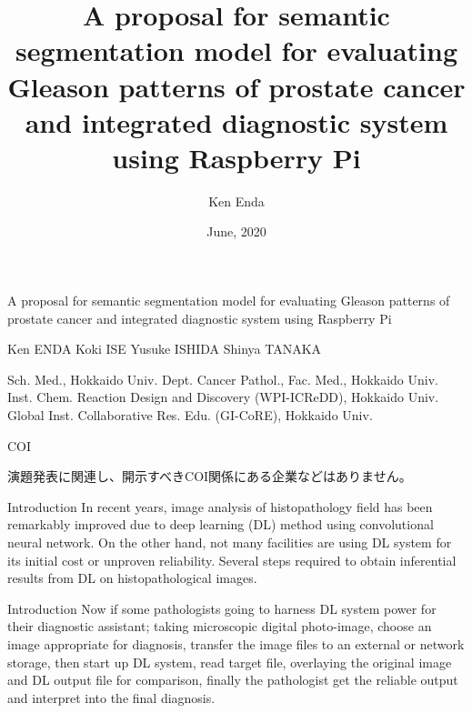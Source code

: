 \documentclass[
  dvipdfmx,
  xcolor={svgnames},
  hyperref={colorlinks,citecolor=DeepPink4,linkcolor=DarkRed,urlcolor=DarkBlue}
  ]{beamer}
\title{}
\title[A proposal of semantic segmentation model for Gleason patterns and integrated diagnostic system using Raspberry Pi]{A proposal for semantic segmentation model for evaluating Gleason patterns of prostate cancer and integrated diagnostic system using Raspberry Pi}
\author{Ken Enda}
\institute{Department of Cancer Pathology Faculty of Medicine, HOKKAIDO UNIVERSITY}
\date[]{June, 2020}
\begin{document}
\nocite{*}

\begin{frame}{}
  \huge A proposal for semantic segmentation model for evaluating Gleason patterns of prostate cancer and integrated diagnostic system using Raspberry Pi\par
  \vspace{0.5zh}
  \small Ken ENDA \cite{student} Koki ISE\cite{student} Yusuke ISHIDA\cite{dept} Shinya TANAKA\cite{dept}\cite{icredd}\cite{gicore}
  \begin{thebibliography}{99}
    \beamertemplatetextbibitems
    \setlength{\itemsep}{-.5zw}
     Sch. Med., Hokkaido Univ.
     Dept. Cancer Pathol., Fac. Med., Hokkaido Univ.
     Inst. Chem. Reaction Design and Discovery (WPI-ICReDD), Hokkaido Univ.  
     Global Inst. Collaborative Res. Edu. (GI-CoRE), Hokkaido Univ.
  \end{thebibliography}
\end{frame}

\begin{frame}{COI}
  \begin{center}
    \setlength{\fboxsep}{1em}
    \par
    \vspace{1zh}
    演題発表に関連し、開示すべきCOI関係にある企業などはありません。
  \end{center}
\end{frame}

\begin{frame}{Introduction}
  In recent years, image analysis of histopathology field has been remarkably improved due to deep learning (DL) method using convolutional neural network. On the other hand, not many facilities are using DL system for its initial cost or unproven reliability. Several steps required to obtain inferential results from DL on histopathological images.
\end{frame}

\begin{frame}{Introduction}
  Now if some pathologists going to harness DL system power for their diagnostic assistant; taking microscopic digital photo-image, choose an image appropriate for diagnosis, transfer the image files to an external or network storage, then start up DL system, read target file, overlaying the original image and DL output file for comparison, finally the pathologist get the reliable output and interpret into the final diagnosis.
\end{frame}
\end{document}
